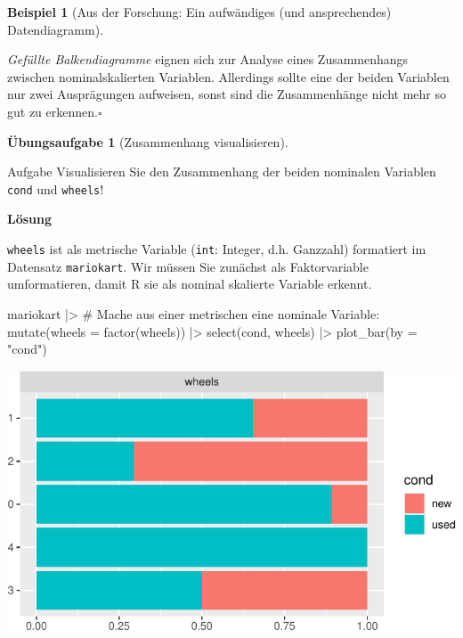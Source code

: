 \documentclass[
  a4paper,
]{scrbook}
\newenvironment{Shaded}{\begin{snugshade}}{\end{snugshade}}
\newcommand{\AttributeTok}[1]{\textcolor[rgb]{0.40,0.45,0.13}{#1}}
\newcommand{\CommentTok}[1]{\textcolor[rgb]{0.37,0.37,0.37}{#1}}
\newcommand{\FunctionTok}[1]{\textcolor[rgb]{0.28,0.35,0.67}{#1}}
\newcommand{\NormalTok}[1]{\textcolor[rgb]{0.00,0.23,0.31}{#1}}
\newcommand{\SpecialCharTok}[1]{\textcolor[rgb]{0.37,0.37,0.37}{#1}}
\newcommand{\StringTok}[1]{\textcolor[rgb]{0.13,0.47,0.30}{#1}}
\theoremstyle{definition}
\newtheorem{example}{Beispiel}[chapter]
\theoremstyle{definition}
\theoremstyle{definition}
\newtheorem{exercise}{Übungsaufgabe}[chapter]
\theoremstyle{remark}
\begin{document}
\begin{example}[Aus der Forschung: Ein aufwändiges (und ansprechendes)
Datendiagramm]
\begin{tcolorbox}[enhanced jigsaw, colbacktitle=quarto-callout-note-color!10!white, bottomrule=.15mm, left=2mm, breakable, rightrule=.15mm, coltitle=black, title=\textcolor{quarto-callout-note-color}{\faInfo}\hspace{0.5em}{Hinweis}, colback=white, leftrule=.75mm, titlerule=0mm, opacityback=0, bottomtitle=1mm, toprule=.15mm, arc=.35mm, toptitle=1mm, opacitybacktitle=0.6, colframe=quarto-callout-note-color-frame]

\emph{Gefüllte Balkendiagramme} eignen sich zur Analyse eines
Zusammenhangs zwischen nominalskalierten Variablen. Allerdings sollte
eine der beiden Variablen nur zwei Ausprägungen aufweisen, sonst sind
die Zusammenhänge nicht mehr so gut zu erkennen.\(\square\)

\end{tcolorbox}

\begin{exercise}[Zusammenhang
visualisieren]\protect\hypertarget{exr-zsmnhang-cond-wheels}{}\label{exr-zsmnhang-cond-wheels}

Aufgabe Visualisieren Sie den Zusammenhang der beiden nominalen
Variablen \texttt{cond} und \texttt{wheels}!

\textbf{Lösung}

\texttt{wheels} ist als metrische Variable (\texttt{int}: Integer, d.h.
Ganzzahl) formatiert im Datensatz \texttt{mariokart}. Wir müssen Sie
zunächst als Faktorvariable umformatieren, damit R sie als nominal
skalierte Variable erkennt.

\begin{Shaded}
\begin{Highlighting}[]
\NormalTok{mariokart }\SpecialCharTok{|\textgreater{}} 
  \CommentTok{\# Mache aus einer metrischen eine nominale Variable: }
  \FunctionTok{mutate}\NormalTok{(}\AttributeTok{wheels =} \FunctionTok{factor}\NormalTok{(wheels)) }\SpecialCharTok{|\textgreater{}} 
  \FunctionTok{select}\NormalTok{(cond, wheels) }\SpecialCharTok{|\textgreater{}} 
  \FunctionTok{plot\_bar}\NormalTok{(}\AttributeTok{by =} \StringTok{"cond"}\NormalTok{)}
\end{Highlighting}
\end{Shaded}

\includegraphics{040-verbildlichen_files/figure-pdf/unnamed-chunk-26-1.pdf}


\end{exercise}
\end{example}
\end{document}
